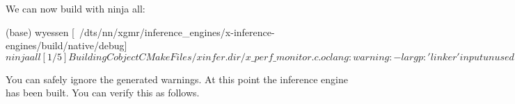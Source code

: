 We can now build with {\ttfamily ninja all}\+: 
\begin{DoxyCode}
(base) wyessen [~/dts/nn/xgmr/inference\_engines/x-inference-engines/build/native/debug] $ ninja all

[1/5] Building C object CMakeFiles/xinfer.dir/x\_perf\_monitor.c.oclang: warning: -largp: 'linker' input
       unused [-Wunused-command-line-argument]
[2/5] Building C object CMakeFiles/xinfer.dir/x\_inference\_lib.c.o
clang: warning: -largp: 'linker' input unused [-Wunused-command-line-argument]
[3/5] Building C object CMakeFiles/x-infer.dir/main.c.o
clang: warning: -largp: 'linker' input unused [-Wunused-command-line-argument]
[4/5] Linking C static library bin/libxinfer.a
/Applications/Xcode.app/Contents/Developer/Toolchains/XcodeDefault.xctoolchain/usr/bin/ranlib: file:
       bin/libxinfer.a(x\_perf\_monitor.c.o) has no symbols
/Applications/Xcode.app/Contents/Developer/Toolchains/XcodeDefault.xctoolchain/usr/bin/ranlib: file:
       bin/libxinfer.a(x\_perf\_monitor.c.o) has no symbols
[5/5] Linking C executable bin/x-infer

(base) wyessen [~/dts/nn/xgmr/inference\_engines/x-inference-engines/build/native/debug] $ 
\end{DoxyCode}


You can safely ignore the generated warnings. At this point the inference engine has been built. You can verify this as follows.


